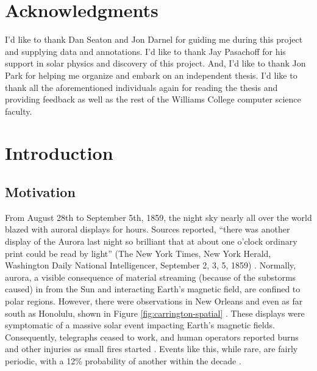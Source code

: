 \documentclass[twoside]{report}
\begin{document}
\chapter*{Acknowledgments}
I'd like to thank Dan Seaton and Jon Darnel for guiding me during this project and supplying data and annotations.  I'd like to thank Jay Pasachoff for his support in solar physics and discovery of this project. And, I'd like to thank Jon Park for helping me organize and embark on an independent thesis. I'd like to thank all the aforementioned individuals again for reading the thesis and providing feedback as well as the rest of the Williams College computer science faculty. 

\chapter{Introduction}
\section{Motivation}
From August 28th to September 5th, 1859, the night sky nearly all over the world blazed with auroral displays for hours. Sources reported, ``there was another display of the Aurora last night so brilliant that at about one o’clock ordinary print could be read by light'' (The New York Times, New York Herald, Washington Daily National Intelligencer, September 2, 3, 5, 1859) \cite{green:2006}. Normally, aurora, a visible consequence of material streaming (because of the substorms caused) in from the Sun and interacting Earth's magnetic field, are confined to polar regions. However, there were observations in New Orleans and even as far south as Honolulu, shown in Figure \ref{fig:carrington-spatial}  \cite{cliver:2004}. These displays were symptomatic of a massive solar event impacting Earth's magnetic fields. Consequently, telegraphs ceased to work, and human operators reported burns and other injuries as small fires started \cite{green:2006}. Events like this, while rare, are fairly periodic, with a 12\% probability of another within the decade \cite{riley:2012}. 
\end{document}
